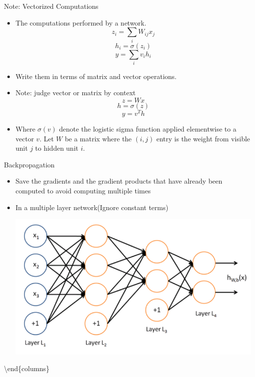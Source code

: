 \documentclass[12pt,notes,mathserif]{beamer}
\providecommand{\tightlist}{%
	\setlength{\itemsep}{0pt}\setlength{\parskip}{0pt}}
\begin{document}
\begin{frame}{Note: Vectorized Computations}

\begin{itemize}
\tightlist
\item
  The computations performed by a network. \[z_i = \sum_{i} W_{ij} x_j\]
  \[h_i=\sigma(z_i)\] \[y=\sum_i v_i h_i\]
\item
  Write them in terms of matrix and vector operations.
\item
  Note: judge vector or matrix by context \[z=Wx\] \[h=\sigma(z)\]
  \[y=v^T h\]
\item
  Where \(\sigma(v)\) denote the logistic sigma function applied
  elementwise to a vector \(v\). Let \(W\) be a matrix where the
  \((i,j)\) entry is the weight from visible unit \(j\) to hidden unit
  \(i\).
\end{itemize}

\end{frame}

\begin{frame}{Backpropagation}

\begin{itemize}
\tightlist
\item
  Save the gradients and the gradient products that have already been
  computed to avoid computing multiple times
\item
  In a multiple layer network(Ignore constant terms)\\

  \begin{center}
  \includegraphics[width=\textwidth]{2018-04-15-13-09-15.png}
  \end{center}
\end{itemize}

\textbackslash{}end\{columns\}

\end{frame}
\end{document}
